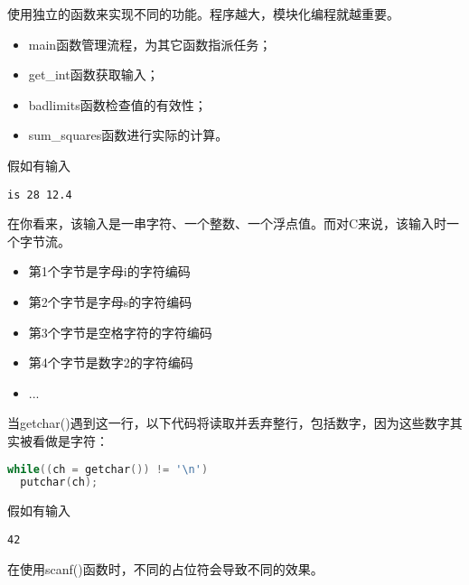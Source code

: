 \begin{frame}[fragile]
使用独立的函数来实现不同的功能。\textcolor{acolor1}{程序越大，模块化编程就越重要。} \vspace{0.1in}

\begin{itemize}
\item main函数管理流程，为其它函数指派任务；\\[0.1in]
\item get\_int函数获取输入；\\[0.1in]
\item badlimits函数检查值的有效性；\\[0.1in]
\item sum\_squares函数进行实际的计算。

\end{itemize}
\end{frame}

\begin{frame}[fragile]
假如有输入
\begin{lstlisting}
is 28 12.4
\end{lstlisting}
在你看来，该输入是一串字符、一个整数、一个浮点值。而对C来说，该输入时一个字节流。\vspace{0.1in}

\begin{itemize}
\item 第1个字节是字母i的字符编码\\[0.1in]
\item 第2个字节是字母s的字符编码\\[0.1in]
\item 第3个字节是空格字符的字符编码\\[0.1in]
\item 第4个字节是数字2的字符编码\\[0.1in]
\item ...
\end{itemize}
\end{frame}

\begin{frame}[fragile]
当{\tf getchar()}遇到这一行，以下代码将读取并丢弃整行，包括数字，因为这些数字其实被看做是字符：
\begin{lstlisting}[language=c]
while((ch = getchar()) != '\n')
  putchar(ch);
\end{lstlisting}
\end{frame}

\begin{frame}[fragile]
假如有输入
\begin{lstlisting}
42
\end{lstlisting}
在使用{\tf scanf()}函数时，不同的占位符会导致不同的效果。
\end{frame}

